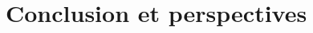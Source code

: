 \section{Conclusion et perspectives}
\label{sec:conclusion_et_perspectives}
  \textcolor{red}{\lipsum[1-3]}

